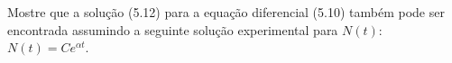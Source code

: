 Mostre que a solução (5.12) para a equação diferencial (5.10) também pode ser encontrada assumindo a seguinte solução experimental para $N(t)$: $N(t) = Ce^{\alpha t}$.
